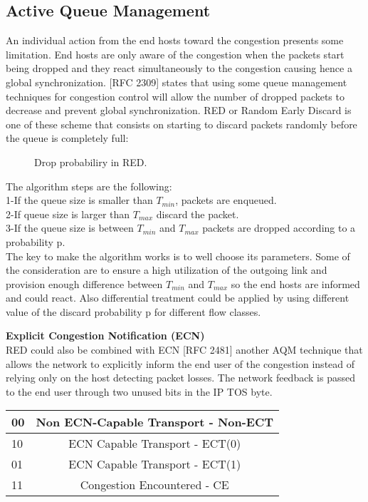 \subsection{Active Queue Management}

An individual action from the end hosts toward the congestion presents some limitation. End hosts are only aware of the congestion when the packets start being dropped and they react simultaneously to the congestion causing hence a global synchronization. [RFC 2309] states that using some queue management techniques for congestion control will allow the number of dropped packets to decrease and prevent global synchronization. 
RED or Random Early Discard is one of these scheme that consists on starting to discard packets randomly before the queue is completely full:

 \begin{figure}[h]
  \begin{center}
\caption{
  Drop probabiliry in RED.
    \label{fig:RED}
}
 \end{center}
\end{figure}

The algorithm steps are the following:\\
1-If the queue size is smaller than $T_{min}$, packets are enqueued.\\
2-If queue size is larger than $T_{max}$ discard the packet.\\
3-If the queue size is between $T_{min}$ and $T_{max}$ packets are dropped according to a probability p.\\

The key to make the algorithm works is to well choose its parameters. Some of the consideration are to ensure a high utilization of the outgoing link and provision enough difference between $T_{min}$ and $T_{max}$ so the end hosts are informed and could react. Also differential treatment could be applied by using different value of the discard probability p for different flow classes. 

{\bf Explicit Congestion Notification (ECN)}
\\RED could also be combined with ECN [RFC 2481] another AQM technique that allows the network to explicitly inform the end user of the congestion instead of relying only on the host detecting packet losses. The network feedback is passed to the end user through two unused bits in the IP TOS byte. \\

\begin{center}
\begin{tabular}{| l | c| } \hline 
00 & Non ECN-Capable Transport - Non-ECT \\ \hline 
10 & ECN Capable Transport - ECT(0) \\ \hline 
01 & ECN Capable Transport - ECT(1) \\ \hline 
11 & Congestion Encountered - CE  \\ \hline 
\end{tabular}
\\
\caption{
  ECN codepoint.
    \label{fig:ECN}
}
\end{center}


